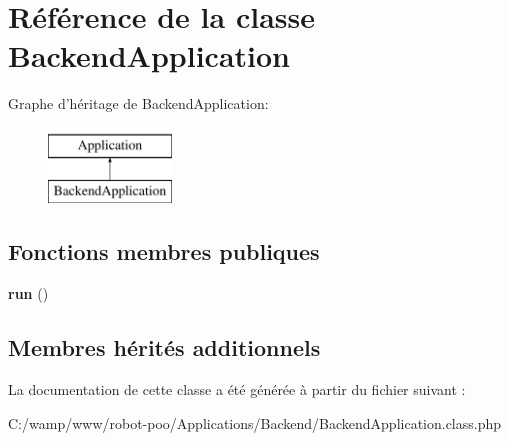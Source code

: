 \hypertarget{class_applications_1_1_backend_1_1_backend_application}{\section{Référence de la classe Backend\+Application}
\label{class_applications_1_1_backend_1_1_backend_application}
}
Graphe d'héritage de Backend\+Application\+:\begin{figure}[H]
\begin{center}
\leavevmode
\includegraphics[height=2.000000cm]{class_applications_1_1_backend_1_1_backend_application}
\end{center}
\end{figure}
\subsection*{Fonctions membres publiques}
\begin{DoxyCompactItemize}
\item 
\hypertarget{class_applications_1_1_backend_1_1_backend_application_afb0fafe7e02a3ae1993c01c19fad2bae}{{\bfseries run} ()}\label{class_applications_1_1_backend_1_1_backend_application_afb0fafe7e02a3ae1993c01c19fad2bae}

\end{DoxyCompactItemize}
\subsection*{Membres hérités additionnels}


La documentation de cette classe a été générée à partir du fichier suivant \+:\begin{DoxyCompactItemize}
\item 
C\+:/wamp/www/robot-\/poo/\+Applications/\+Backend/Backend\+Application.\+class.\+php\end{DoxyCompactItemize}

